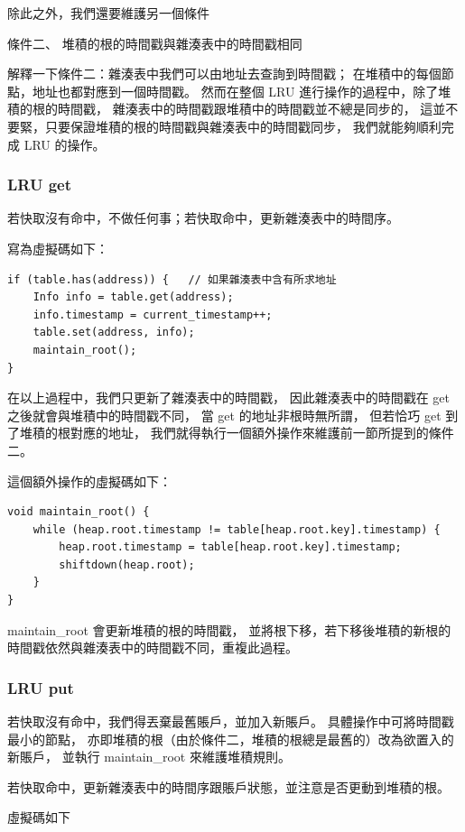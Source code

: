 除此之外，我們還要維護另一個條件

條件二、 堆積的根的時間戳與雜湊表中的時間戳相同

解釋一下條件二：雜湊表中我們可以由地址去查詢到時間戳；
在堆積中的每個節點，地址也都對應到一個時間戳。
然而在整個 LRU 進行操作的過程中，除了堆積的根的時間戳，
雜湊表中的時間戳跟堆積中的時間戳並不總是同步的，
這並不要緊，只要保證堆積的根的時間戳與雜湊表中的時間戳同步，
我們就能夠順利完成 LRU 的操作。

\subsubsection{LRU get}

若快取沒有命中，不做任何事；若快取命中，更新雜湊表中的時間序。

寫為虛擬碼如下：
\begin{lstlisting}
if (table.has(address)) {   // 如果雜湊表中含有所求地址
    Info info = table.get(address);
    info.timestamp = current_timestamp++;
    table.set(address, info);
    maintain_root();
}
\end{lstlisting}

在以上過程中，我們只更新了雜湊表中的時間戳，
因此雜湊表中的時間戳在 get 之後就會與堆積中的時間戳不同，
當 get 的地址非根時無所謂，
但若恰巧 get 到了堆積的根對應的地址，
我們就得執行一個額外操作來維護前一節所提到的條件二。

這個額外操作的虛擬碼如下：

\begin{lstlisting}
void maintain_root() {
    while (heap.root.timestamp != table[heap.root.key].timestamp) {
        heap.root.timestamp = table[heap.root.key].timestamp;
        shiftdown(heap.root);
    }
}
\end{lstlisting}

maintain\_root 會更新堆積的根的時間戳，
並將根下移，若下移後堆積的新根的時間戳依然與雜湊表中的時間戳不同，重複此過程。

\subsubsection{LRU put}
若快取沒有命中，我們得丟棄最舊賬戶，並加入新賬戶。
具體操作中可將時間戳最小的節點，
亦即堆積的根（由於條件二，堆積的根總是最舊的）改為欲置入的新賬戶，
並執行 maintain\_root 來維護堆積規則。

若快取命中，更新雜湊表中的時間序跟賬戶狀態，並注意是否更動到堆積的根。

虛擬碼如下

